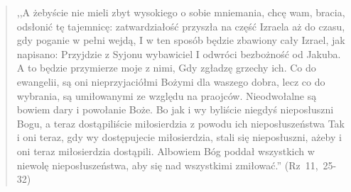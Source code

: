 \documentclass[10pt,a4paper,oneside]{article}
\begin{document}
\begin{quote}
,,A żebyście nie mieli zbyt wysokiego o sobie mniemania, chcę wam, bracia, odsłonić tę tajemnicę: zatwardziałość przyszła na część Izraela aż do czasu, gdy poganie w pełni wejdą, I w ten sposób będzie zbawiony cały Izrael, jak napisano: Przyjdzie z Syjonu wybawiciel I odwróci bezbożność od Jakuba. A to będzie przymierze moje z nimi, Gdy zgładzę grzechy ich. Co do ewangelii, są oni nieprzyjaciółmi Bożymi dla waszego dobra, lecz co do wybrania, są umiłowanymi ze względu na praojców. Nieodwołalne są bowiem dary i powołanie Boże. Bo jak i wy byliście niegdyś nieposłuszni Bogu, a teraz dostąpiliście miłosierdzia z powodu ich nieposłuszeństwa Tak i oni teraz, gdy wy dostępujecie miłosierdzia, stali się nieposłuszni, ażeby i oni teraz miłosierdzia dostąpili. Albowiem Bóg poddał wszystkich w niewolę nieposłuszeństwa, aby się nad wszystkimi zmiłować.'' \mbox{(Rz 11, 25-32)}
\end{quote}
\end{document}
